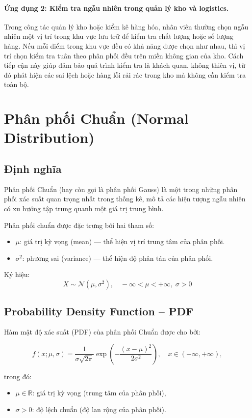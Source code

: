 \documentclass[a4paper,12pt]{article}
\begin{document}
\paragraph{Ứng dụng 2: Kiểm tra ngẫu nhiên trong quản lý kho và logistics.} 
Trong công tác quản lý kho hoặc kiểm kê hàng hóa, nhân viên thường chọn ngẫu nhiên một vị trí trong khu vực lưu trữ để kiểm tra chất lượng hoặc số lượng hàng. Nếu mỗi điểm trong khu vực đều có khả năng được chọn như nhau, thì vị trí chọn kiểm tra tuân theo phân phối đều trên miền không gian của kho. 
Cách tiếp cận này giúp đảm bảo quá trình kiểm tra là khách quan, không thiên vị, từ đó phát hiện các sai lệch hoặc hàng lỗi rải rác trong kho mà không cần kiểm tra toàn bộ.

\section{Phân phối Chuẩn (Normal Distribution)}

\subsection{Định nghĩa}

Phân phối Chuẩn (hay còn gọi là phân phối Gauss) là một trong những phân phối xác suất quan trọng nhất trong thống kê, mô tả các hiện tượng ngẫu nhiên có xu hướng tập trung quanh một giá trị trung bình.  

Phân phối chuẩn được đặc trưng bởi hai tham số:
\begin{itemize}
    \item $\mu$: giá trị kỳ vọng (mean) — thể hiện vị trí trung tâm của phân phối.
    \item $\sigma^2$: phương sai (variance) — thể hiện độ phân tán của phân phối.
\end{itemize}
Ký hiệu:
\[
X \sim \mathcal{N}(\mu,\sigma^2), \quad -\infty < \mu < +\infty, \; \sigma > 0
\]


\subsection{Probability Density Function – PDF}

Hàm mật độ xác suất (PDF) của phân phối Chuẩn được cho bởi:

\[
f(x;\mu,\sigma) = \frac{1}{\sigma\sqrt{2\pi}}
\exp\left(-\frac{(x-\mu)^2}{2\sigma^2}\right), \quad x \in (-\infty, +\infty),
\]

trong đó:
\begin{itemize}
    \item \(\mu \in \mathbb{R}\): giá trị kỳ vọng (trung tâm của phân phối),
    \item \(\sigma > 0\): độ lệch chuẩn (độ lan rộng của phân phối).
\end{itemize}
\end{document}
